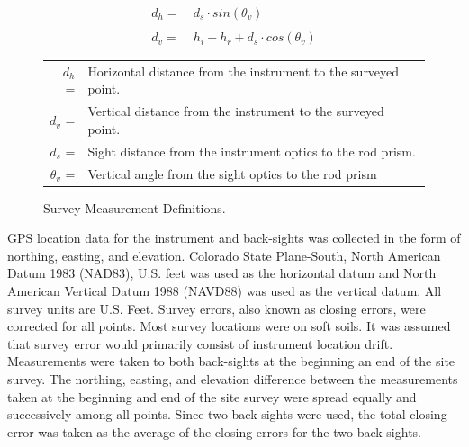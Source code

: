 \begin{linenumbers}
\begin{figure}[htbp]
\begin{align}
	d_h=&\:d_s \cdot sin(\theta_v) \label{eq:horizontal} \\
	\nonumber \\
	d_v=&\:h_i-h_r+d_s \cdot cos(\theta_v) \label{eq:vertical}
\end{align}
\begin{tabular}{r l}
	        $d_h$ = & Horizontal distance from the instrument to the surveyed point.                    \\
	        $d_v$ = & Vertical distance from the instrument to the surveyed point.                      \\
	        $d_s$ = & Sight distance from the instrument optics to the rod prism.                       \\
	   $\theta_v$ = & Vertical angle from the sight optics to the rod prism                             \\
\end{tabular}
	\caption[Survey Measurement Definitions.]{Survey Measurement Definitions.}
	\label{fig:SurveyMeasurements}
\end{figure}

GPS location data for the instrument and back-sights was collected in the form of northing, easting, and elevation.  Colorado State Plane-South, North American Datum 1983 (NAD83), U.S. feet was used as the horizontal datum and North American Vertical Datum 1988 (NAVD88) was used as the vertical datum.  All survey units are U.S. Feet.  Survey errors, also known as closing errors, were corrected for all points.  Most survey locations were on soft soils.  It was assumed that survey error would primarily consist of instrument location drift.  Measurements were taken to both back-sights at the beginning an end of the site survey.  The northing, easting, and elevation difference between the measurements taken at the beginning and end of the site survey were spread equally and successively among all points.  Since two back-sights were used, the total closing error was taken as the average of the closing errors for the two back-sights.  


\end{linenumbers}
